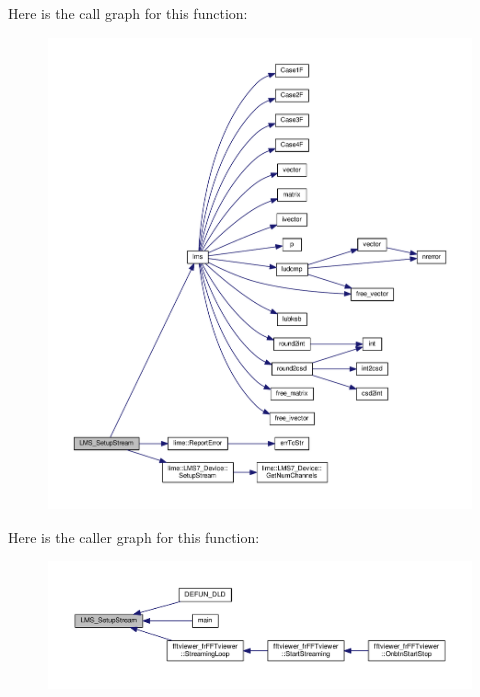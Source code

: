 Here is the call graph for this function\+:
\nopagebreak
\begin{figure}[H]
\begin{center}
\leavevmode
\includegraphics[width=350pt]{df/de1/lms7__api_8cpp_a77a9a5cd43aea28499a07f93951640b2_cgraph}
\end{center}
\end{figure}




Here is the caller graph for this function\+:
\nopagebreak
\begin{figure}[H]
\begin{center}
\leavevmode
\includegraphics[width=350pt]{df/de1/lms7__api_8cpp_a77a9a5cd43aea28499a07f93951640b2_icgraph}
\end{center}
\end{figure}



